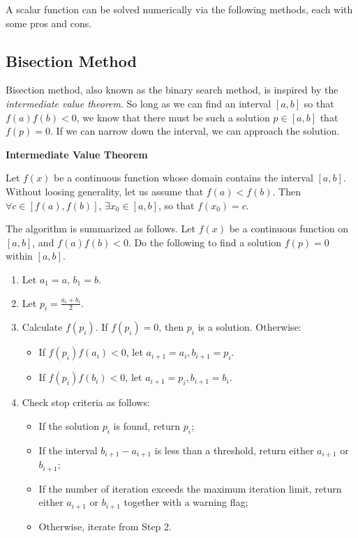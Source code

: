 A scalar function can be solved numerically via the following methods, each with some pros and cons.

\subsection{Bisection Method}

Bisection method, also known as the binary search method, is inspired by the \textit{intermediate value theorem}. So long as we can find an interval $\left[a, b\right]$ so that $f(a)f(b)<0$, we know that there must be such a solution $p\in\left[a, b\right]$ that $f(p)=0$. If we can narrow down the interval, we can approach the solution.

\begin{mdframed}
\noindent \textbf{Intermediate Value Theorem}

Let $f(x)$ be a continuous function whose domain contains the interval $\left[a, b\right]$. Without loosing generality, let us assume that $f(a)<f(b)$. Then $\forall c \in \left[f(a), f(b)\right]$, $\exists x_0 \in \left[a, b\right]$, so that $f(x_0)=c$.

\end{mdframed}

The algorithm is summarized as follows. Let $f(x)$ be a continuous function on $\left[a, b\right]$, and $f(a)f(b)<0$. Do the following to find a solution $f(p)=0$ within $\left[a, b\right]$.

\begin{enumerate}
\item Let $a_1 = a$, $b_1=b$.
\item Let $p_i = \frac{a_i+b_i}{2}$.
\item Calculate $f(p_i)$. If $f(p_i)=0$, then $p_i$ is a solution. Otherwise:
\begin{itemize}
  \item If $f(p_i)f(a_i) < 0$, let $a_{i+1}=a_i, b_{i+1}=p_i$.
  \item If $f(p_i)f(b_i) < 0$, let $a_{i+1}=p_i, b_{i+1}=b_i$.
\end{itemize}
\item Check stop criteria as follows:
\begin{itemize}
  \item If the solution $p_i$ is found, return $p_i$;
  \item If the interval $b_{i+1}-a_{i+1}$ is less than a threshold, return either $a_{i+1}$ or $b_{i+1}$;
  \item If the number of iteration exceeds the maximum iteration limit, return either $a_{i+1}$ or $b_{i+1}$ together with a warning flag;
  \item Otherwise, iterate from Step 2. 
\end{itemize}
\end{enumerate}

